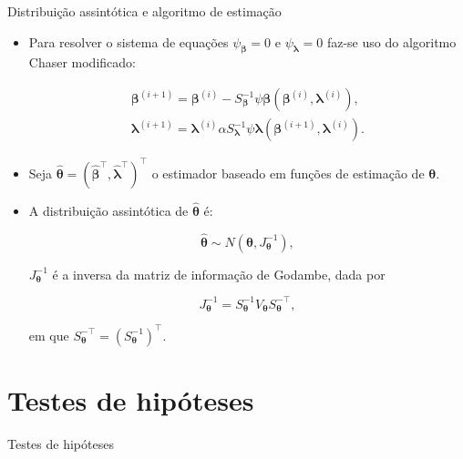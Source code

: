 \documentclass[
  ignorenonframetext,
  serif,
  professionalfont,
  usenames,
  dvipsnames,
  aspectratio = 169]{beamer}
\begin{document}
\begin{frame}{Distribuição assintótica e algoritmo de estimação}
\protect\hypertarget{distribuiuxe7uxe3o-assintuxf3tica-e-algoritmo-de-estimauxe7uxe3o}{}
\begin{itemize}

  \item Para resolver o sistema de equações $\psi_{\boldsymbol{\beta}} = 0$ e $\psi_{\boldsymbol{\lambda}} = 0$ faz-se uso do algoritmo Chaser modificado:

$$
\begin{matrix}
\boldsymbol{\beta}^{(i+1)} = \boldsymbol{\beta}^{(i)}- S_{\boldsymbol{\beta}}^{-1} \psi \boldsymbol{\beta} (\boldsymbol{\beta}^{(i)}, \boldsymbol{\lambda}^{(i)}), \\ 
\boldsymbol{\lambda}^{(i+1)} = \boldsymbol{\lambda}^{(i)}\alpha S_{\boldsymbol{\lambda}}^{-1} \psi \boldsymbol{\lambda} (\boldsymbol{\beta}^{(i+1)}, \boldsymbol{\lambda}^{(i)}).
\end{matrix}
$$

  \item Seja $\boldsymbol{\hat{\theta}} = (\boldsymbol{\hat{\beta}^{\top}}, \boldsymbol{\hat{\lambda}^{\top}})^{\top}$ o estimador baseado em funções de estimação de $\boldsymbol{\theta}$.
  
  \item A distribuição assintótica de $\boldsymbol{\hat{\theta}}$ é:

$$
\boldsymbol{\hat{\theta}} \sim N(\boldsymbol{\theta}, J_{\boldsymbol{\theta}}^{-1}),
$$

\noindent $J_{\boldsymbol{\theta}}^{-1}$ é a inversa da matriz de informação de Godambe, dada por
  
$$J_{\boldsymbol{\theta}}^{-1} = S_{\boldsymbol{\theta}}^{-1} V_{\boldsymbol{\theta}} S_{\boldsymbol{\theta}}^{-\top},$$ 

\noindent em que $S_{\boldsymbol{\theta}}^{-\top} = (S_{\boldsymbol{\theta}}^{-1})^{\top}.$

\end{itemize}
\end{frame}

\hypertarget{testes-de-hipuxf3teses}{%
\section{Testes de hipóteses}\label{testes-de-hipuxf3teses}}

\begin{frame}{Testes de hipóteses}
\end{frame}
\end{document}
